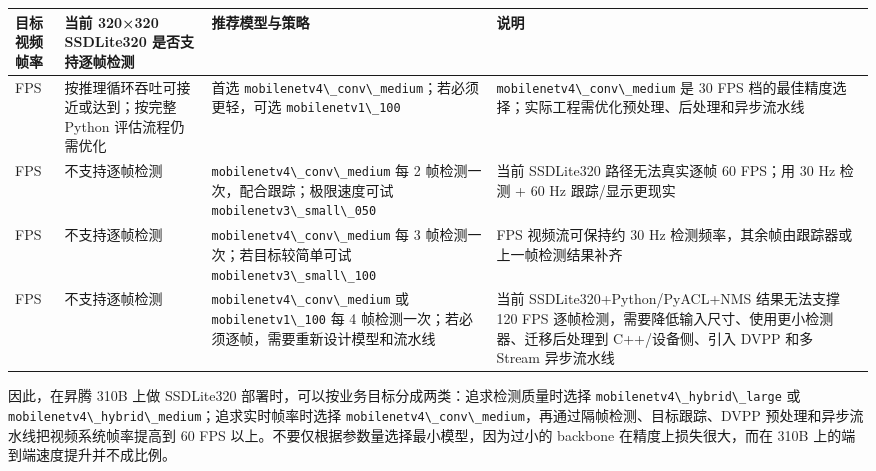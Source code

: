 \begin{longtable}[]{@{}
  >{\raggedright\arraybackslash}p{}
  >{\raggedright\arraybackslash}p{}
  >{\raggedright\arraybackslash}p{}
  >{\raggedright\arraybackslash}p{}@{}}
\toprule\noalign{}
\begin{minipage}[b]{\linewidth}\raggedright
目标视频帧率
\end{minipage} & \begin{minipage}[b]{\linewidth}\raggedright
当前 320×320 SSDLite320 是否支持逐帧检测
\end{minipage} & \begin{minipage}[b]{\linewidth}\raggedright
推荐模型与策略
\end{minipage} & \begin{minipage}[b]{\linewidth}\raggedright
说明
\end{minipage} \\
\midrule\noalign{}
\endhead
\bottomrule\noalign{}
\endlastfoot
30 FPS & 按推理循环吞吐可接近或达到；按完整 Python 评估流程仍需优化 &
首选
\passthrough{\lstinline!mobilenetv4\_conv\_medium!}；若必须更轻，可选
\passthrough{\lstinline!mobilenetv1\_100!} &
\passthrough{\lstinline!mobilenetv4\_conv\_medium!} 是 30 FPS
档的最佳精度选择；实际工程需优化预处理、后处理和异步流水线 \\
60 FPS & 不支持逐帧检测 &
\passthrough{\lstinline!mobilenetv4\_conv\_medium!} 每 2
帧检测一次，配合跟踪；极限速度可试
\passthrough{\lstinline!mobilenetv3\_small\_050!} & 当前 SSDLite320
路径无法真实逐帧 60 FPS；用 30 Hz 检测 + 60 Hz 跟踪/显示更现实 \\
90 FPS & 不支持逐帧检测 &
\passthrough{\lstinline!mobilenetv4\_conv\_medium!} 每 3
帧检测一次；若目标较简单可试
\passthrough{\lstinline!mobilenetv3\_small\_100!} & 90 FPS
视频流可保持约 30 Hz 检测频率，其余帧由跟踪器或上一帧检测结果补齐 \\
120 FPS & 不支持逐帧检测 &
\passthrough{\lstinline!mobilenetv4\_conv\_medium!} 或
\passthrough{\lstinline!mobilenetv1\_100!} 每 4
帧检测一次；若必须逐帧，需要重新设计模型和流水线 & 当前
SSDLite320+Python/PyACL+NMS 结果无法支撑 120 FPS
逐帧检测，需要降低输入尺寸、使用更小检测器、迁移后处理到
C++/设备侧、引入 DVPP 和多 Stream 异步流水线 \\
\end{longtable}

因此，在昇腾 310B 上做 SSDLite320
部署时，可以按业务目标分成两类：追求检测质量时选择
\passthrough{\lstinline!mobilenetv4\_hybrid\_large!} 或
\passthrough{\lstinline!mobilenetv4\_hybrid\_medium!}；追求实时帧率时选择
\passthrough{\lstinline!mobilenetv4\_conv\_medium!}，再通过隔帧检测、目标跟踪、DVPP
预处理和异步流水线把视频系统帧率提高到 60 FPS
以上。不要仅根据参数量选择最小模型，因为过小的 backbone
在精度上损失很大，而在 310B 上的端到端速度提升并不成比例。

